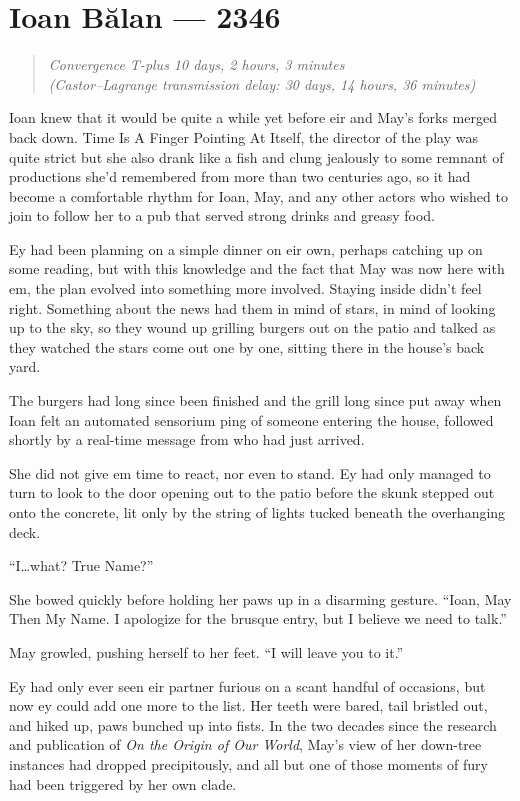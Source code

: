 \hypertarget{ioan-bux103lan-2346}{%
\chapter{Ioan Bălan — 2346}\label{ioan-bux103lan-2346}}

\begin{quote}
\emph{Convergence T-plus 10 days, 2 hours, 3 minutes}\\
\emph{(Castor--Lagrange transmission delay: 30 days, 14 hours, 36 minutes)}
\end{quote}

Ioan knew that it would be quite a while yet before eir and May's forks merged back down. Time Is A Finger Pointing At Itself, the director of the play was quite strict but she also drank like a fish and clung jealously to some remnant of productions she'd remembered from more than two centuries ago, so it had become a comfortable rhythm for Ioan, May, and any other actors who wished to join to follow her to a pub that served strong drinks and greasy food.

Ey had been planning on a simple dinner on eir own, perhaps catching up on some reading, but with this knowledge and the fact that May was now here with em, the plan evolved into something more involved. Staying inside didn't feel right. Something about the news had them in mind of stars, in mind of looking up to the sky, so they wound up grilling burgers out on the patio and talked as they watched the stars come out one by one, sitting there in the house's back yard.

The burgers had long since been finished and the grill long since put away when Ioan felt an automated sensorium ping of someone entering the house, followed shortly by a real-time message from who had just arrived.

She did not give em time to react, nor even to stand. Ey had only managed to turn to look to the door opening out to the patio before the skunk stepped out onto the concrete, lit only by the string of lights tucked beneath the overhanging deck.

``I\ldots what? True Name?''

She bowed quickly before holding her paws up in a disarming gesture. ``Ioan, May Then My Name. I apologize for the brusque entry, but I believe we need to talk.''

May growled, pushing herself to her feet. ``I will leave you to it.''

Ey had only ever seen eir partner furious on a scant handful of occasions, but now ey could add one more to the list. Her teeth were bared, tail bristled out, and hiked up, paws bunched up into fists. In the two decades since the research and publication of \emph{On the Origin of Our World}, May's view of her down-tree instances had dropped precipitously, and all but one of those moments of fury had been triggered by her own clade.

